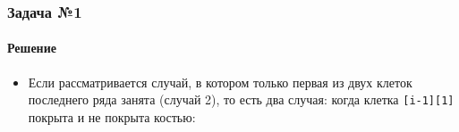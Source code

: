 \documentclass{beamer}
\begin{document}
\begin{frame}
\frametitle{Задача №1}
\framesubtitle{Решение}
\fontsize{10pt}{7.2}\selectfont
\begin{itemize}
\item Если рассматривается случай, в котором только первая из двух клеток последнего ряда занята (случай 2), то есть два случая: когда клетка \texttt{[i-1][1]} покрыта и не покрыта костью:

\begin{figure}%
    \centering
    \qquad
    \qquad
\end{figure}


\end{itemize}
\end{frame}
\end{document}
